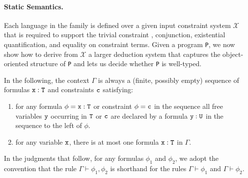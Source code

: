 \paragraph{Static Semantics.}
Each language in the family is defined over a given input constraint system $\mathcal{X}$ that is required to support the trivial constraint \true{}, conjunction, existential quantification, and equality on constraint terms. Given a program {\tt P}, we now show how to derive from $\mathcal{X}$ a larger deduction system that captures the object-oriented structure of {\tt P} and lets us decide whether {\tt P} is well-typed.

In the following, the context $\Gamma$ is always a
(finite, possibly empty) sequence of formulas $\tt x:T$ and constraints $\tt c$ satisfying:
\begin{enumerate}
  \item for any formula $\phi=\tt x:T$ or constraint $\phi=\tt c$ in the sequence all free variables $\tt y$
  occurring in $\tt T$ or $\tt c$ are declared by a formula $\tt
  y:U$ in the sequence to the left of $\phi$.

  \item for any variable $\tt x$, there is at most one
  formula $\tt x:T$ in $\Gamma$.
\end{enumerate}

\medskip

In the judgments that follow, 
for any formulas $\phi_1$ and
$\phi_2$, we adopt the convention that the rule $\Gamma \vdash \phi_1, \phi_2$
is shorthand for the rules
$\Gamma \vdash \phi_1$
and
$\Gamma \vdash \phi_2$.

